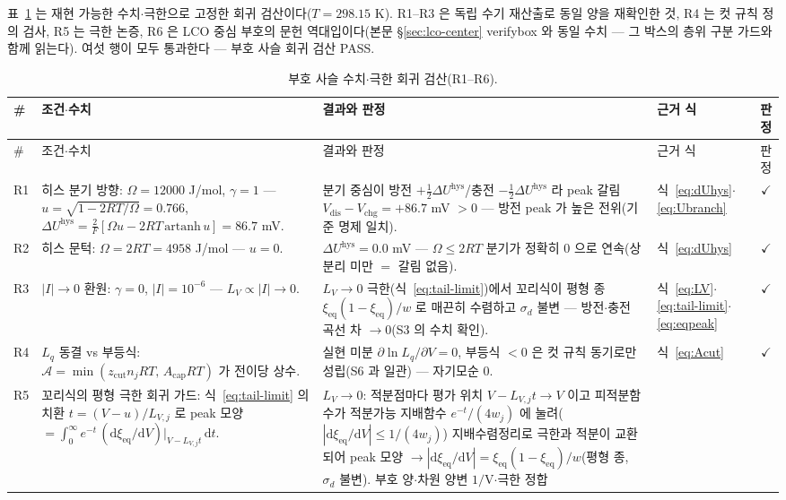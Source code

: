 \documentclass[11pt,a4paper]{article}
\newcommand{\dd}{\mathrm{d}}
\newcommand{\eq}{\mathrm{eq}}
\newcommand{\dis}{\mathrm{dis}}
\newcommand{\chg}{\mathrm{chg}}
\newcommand{\hys}{\mathrm{hys}}
\begin{document}
표~\ref{tab:signcheck-R} 는 재현 가능한 수치$\cdot$극한으로 고정한 회귀 검산이다($T=298.15$ K).
R1--R3 은 독립 수기 재산출로 동일 양을 재확인한 것, R4 는 컷 규칙 정의 검사, R5 는 극한 논증,
R6 은 LCO 중심 부호의 문헌 역대입이다(본문 \S\ref{sec:lco-center} verifybox 와 동일 수치 ---
그 박스의 층위 구분 가드와 함께 읽는다). 여섯 행이 모두 통과한다 --- 부호 사슬 회귀 검산 PASS.

\begin{longtable}{@{}l p{6.2cm} p{5.0cm} p{2.2cm} c@{}}
\caption{부호 사슬 수치$\cdot$극한 회귀 검산(R1--R6).}\label{tab:signcheck-R}\\
\toprule
\# & 조건$\cdot$수치 & 결과와 판정 & 근거 식 & 판정 \\
\midrule
\endfirsthead
\toprule
\# & 조건$\cdot$수치 & 결과와 판정 & 근거 식 & 판정 \\
\midrule
\endhead
R1 & 히스 분기 방향: $\Omega=12000$ J/mol, $\gamma=1$ ---
$u=\sqrt{1-2RT/\Omega}=0.766$, $\Delta U^\hys=\frac{2}{F}[\Omega u-2RT\,\mathrm{artanh}\,u]=86.7$ mV.
& 분기 중심이 방전 $+\tfrac12\Delta U^\hys$/충전 $-\tfrac12\Delta U^\hys$ 라 peak 갈림
$V_\dis-V_\chg=+86.7$ mV $>0$ --- 방전 peak 가 높은 전위(기준 명제 일치).
& 식~\eqref{eq:dUhys}$\cdot$ \eqref{eq:Ubranch} & $\checkmark$ \\
R2 & 히스 문턱: $\Omega=2RT=4958$ J/mol --- $u=0$.
& $\Delta U^\hys=0.0$ mV --- $\Omega\le2RT$ 분기가 정확히 $0$ 으로 연속(상분리 미만 $=$ 갈림 없음).
& 식~\eqref{eq:dUhys} & $\checkmark$ \\
R3 & $|I|\!\to\!0$ 환원: $\gamma=0$, $|I|=10^{-6}$ --- $L_V\propto|I|\to0$.
& $L_V\to0$ 극한(식~\eqref{eq:tail-limit})에서 꼬리식이 평형 종 $\xi_\eq(1-\xi_\eq)/w$ 로 매끈히 수렴하고 $\sigma_d$ 불변 ---
방전$\cdot$충전 곡선 차 $\to0$(S3 의 수치 확인).
& 식~\eqref{eq:LV}$\cdot$ \eqref{eq:tail-limit}$\cdot$\eqref{eq:eqpeak} & $\checkmark$ \\
R4 & $L_q$ 동결 vs 부등식: $\mathcal A=\min(z_\mathrm{cut}n_jRT,\,A_\mathrm{cap}RT)$ 가 전이당 상수.
& 실현 미분 $\partial\ln L_q/\partial V=0$, 부등식 $<0$ 은 컷 규칙 동기로만 성립(S6 과 일관) ---
자기모순 $0$. & 식~\eqref{eq:Acut} & $\checkmark$ \\
R5 & 꼬리식의 평형 극한 회귀 가드: 식~\eqref{eq:tail-limit} 의 치환 $t=(V-u)/L_{V,j}$ 로
peak 모양 $=\int_0^\infty e^{-t}\,(\dd\xi_\eq/\dd V)|_{V-L_{V,j}t}\,\dd t$.
& $L_V\to0$: 적분점마다 평가 위치 $V-L_{V,j}t\to V$ 이고 피적분함수가 적분가능 지배함수 $e^{-t}/(4w_j)$ 에
눌려($|\dd\xi_\eq/\dd V|\le1/(4w_j)$) 지배수렴정리로 극한과 적분이 교환되어 peak 모양
$\to|\dd\xi_\eq/\dd V|=\xi_\eq(1-\xi_\eq)/w$(평형 종, $\sigma_d$ 불변). 부호 양$\cdot$차원 양변 $1/$V$\cdot$극한 정합

\end{longtable}
\end{document}

